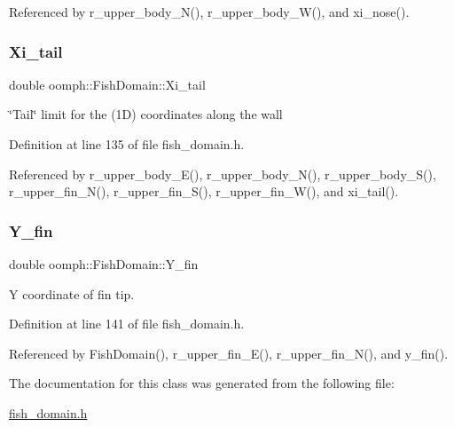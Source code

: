 Referenced by r\+\_\+upper\+\_\+body\+\_\+\+N(), r\+\_\+upper\+\_\+body\+\_\+\+W(), and xi\+\_\+nose().

\mbox{\label{classoomph_1_1FishDomain_a38633d4f3e2777be9544b907d1de5870}} 
\subsubsection{\texorpdfstring{Xi\+\_\+tail}{Xi\_tail}}
{\footnotesize\ttfamily double oomph\+::\+Fish\+Domain\+::\+Xi\+\_\+tail\hspace{0.3cm}{\ttfamily [private]}}



\char`\"{}\+Tail\char`\"{} limit for the (1D) coordinates along the wall 



Definition at line 135 of file fish\+\_\+domain.\+h.



Referenced by r\+\_\+upper\+\_\+body\+\_\+\+E(), r\+\_\+upper\+\_\+body\+\_\+\+N(), r\+\_\+upper\+\_\+body\+\_\+\+S(), r\+\_\+upper\+\_\+fin\+\_\+\+N(), r\+\_\+upper\+\_\+fin\+\_\+\+S(), r\+\_\+upper\+\_\+fin\+\_\+\+W(), and xi\+\_\+tail().

\mbox{\label{classoomph_1_1FishDomain_a162b4a35d8d0e986d254651571844253}} 
\subsubsection{\texorpdfstring{Y\+\_\+fin}{Y\_fin}}
{\footnotesize\ttfamily double oomph\+::\+Fish\+Domain\+::\+Y\+\_\+fin\hspace{0.3cm}{\ttfamily [private]}}



Y coordinate of fin tip. 



Definition at line 141 of file fish\+\_\+domain.\+h.



Referenced by Fish\+Domain(), r\+\_\+upper\+\_\+fin\+\_\+\+E(), r\+\_\+upper\+\_\+fin\+\_\+\+N(), and y\+\_\+fin().



The documentation for this class was generated from the following file\+:\begin{DoxyCompactItemize}
\item 
\hyperlink{fish__domain_8h}{fish\+\_\+domain.\+h}\end{DoxyCompactItemize}
